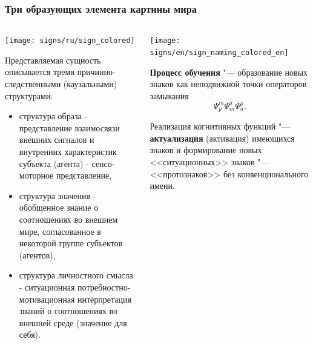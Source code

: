 \documentclass[default]{beamer}
\begin{document}
	\begin{frame}
		\frametitle{Три образующих элемента картины мира}
		\scriptsize
		\begin{columns}
			\begin{column}{0.6\textwidth}
				\begin{center}
					\texttt{[image: signs/ru/sign\_colored]}
				\end{center}
				\vspace{-5pt}
				Представляемая сущность описывается тремя причинно-следственными (каузальными) структурами:
				\begin{itemize}
					\item {\color{red}структура образа} - представление взаимосвязи внешних сигналов и внутренних характеристик субъекта (агента) - сенсо-моторное представление,
					\item {\color{blue}структура значения} - обобщенное знание о соотношениях во внешнем мире, согласованное в некоторой группе субъектов (агентов),
					\item {\color{green!60!black}структура личностного смысла} - ситуационная потребностно-мотивационная интерпретация знаний о соотношениях во внешней среде (значение для себя).
				\end{itemize}
			\end{column}
			\begin{column}{0.4\textwidth}
				\begin{center}
					\texttt{[image: signs/en/sign\_naming\_colored\_en]}
				\end{center}
				\textbf{Процесс обучения} "--- образование новых знаков как неподвижной точки операторов замыкания 
				\[\Psi_p^m\Psi_m^a\Psi_a^p.\]
				\par\smallskip
				Реализация когнитивных функций "--- \textbf{актуализация} (активация) имеющихся знаков и формирование новых <<ситуационных>> знаков "--- <<протознаков>> без конвенционального имени.
			\end{column}
		\end{columns}
	\end{frame}
\end{document}
